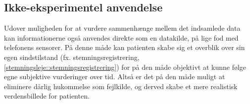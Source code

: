 \subsection{Ikke-eksperimentel anvendelse}
Udover muligheden for at vurdere sammenhænge mellem det indsamlede data kan informationerne også anvendes direkte som en datakilde, på lige fod med telefonens sensorer.
På denne måde kan patienten skabe sig et overblik over sin egen sindstilstand (fx. stemningsregistrering, \cref{stemningsleje::stemningsregistrering}) for på den måde objektivt at kunne følge egne subjektive vurderinger over tid.
Altså er det på den måde muligt at eliminere dårlig hukommelse som fejlkilde, og derved skabe et mere realistisk verdensbillede for patienten.
